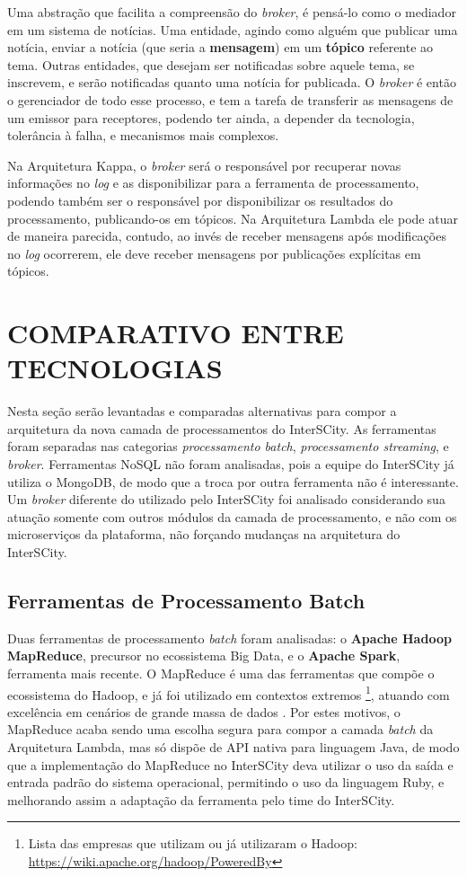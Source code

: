 Uma abstração que facilita a compreensão do \textit{broker}, é pensá-lo como o
mediador em um sistema de notícias. Uma entidade, agindo como alguém que publicar
uma notícia, enviar a notícia (que seria a \textbf{mensagem}) em um
\textbf{tópico} referente ao tema. Outras entidades, que desejam ser notificadas
sobre aquele tema, se inscrevem, e serão notificadas quanto uma notícia for
publicada. O \textit{broker} é então o gerenciador de todo esse processo, e tem
a tarefa de transferir as mensagens de um emissor para receptores, podendo ter
ainda, a depender da tecnologia, tolerância à falha, e mecanismos mais
complexos.

Na Arquitetura Kappa, o \textit{broker} será o responsável por recuperar
novas informações no \textit{log} e as disponibilizar para a ferramenta de
processamento, podendo também ser o responsável por disponibilizar os
resultados do processamento, publicando-os em tópicos. Na Arquitetura Lambda
ele pode atuar de maneira parecida, contudo, ao invés de receber mensagens após
modificações no \textit{log} ocorrerem, ele deve receber mensagens por
publicações explícitas em tópicos.

\section{COMPARATIVO ENTRE TECNOLOGIAS}

Nesta seção serão levantadas e comparadas alternativas para compor a
arquitetura da nova camada de processamentos do InterSCity. As ferramentas
foram separadas nas categorias \textit{processamento batch},
\textit{processamento streaming}, e \textit{broker}. Ferramentas NoSQL não
foram analisadas, pois a equipe do InterSCity já utiliza o MongoDB, de modo
que a troca por outra ferramenta não é interessante. Um \textit{broker}
diferente do utilizado pelo InterSCity foi analisado considerando sua atuação
somente com outros módulos da camada de processamento, e não com os
microserviços da plataforma, não forçando mudanças na arquitetura do InterSCity.

\subsection{Ferramentas de Processamento Batch}

Duas ferramentas de processamento \textit{batch} foram analisadas: o
\textbf{Apache Hadoop MapReduce}, precursor no ecossistema Big Data, e o
\textbf{Apache Spark}, ferramenta mais recente. O MapReduce é uma das
ferramentas que compõe o ecossistema do Hadoop, e já foi utilizado em contextos
extremos \cite{zaharia2008}\footnote{Lista das empresas que utilizam ou já
utilizaram o Hadoop: \url{https://wiki.apache.org/hadoop/PoweredBy}}, atuando
com excelência em cenários de grande massa de dados \cite{zaharia2008}. Por
estes motivos, o MapReduce acaba sendo uma escolha segura para compor a camada
\textit{batch} da Arquitetura Lambda, mas só dispõe de API nativa para
linguagem Java, de modo que a implementação do MapReduce no InterSCity deva
utilizar o uso da saída e entrada padrão do sistema operacional, permitindo o
uso da linguagem Ruby, e melhorando assim a adaptação da ferramenta pelo time
do InterSCity.

